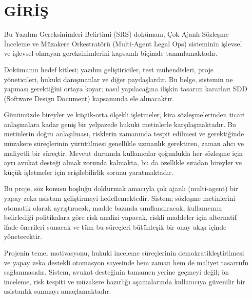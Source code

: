 \documentclass[12pt, a4paper]{article}
\begin{document}
\newpage
\tableofcontents
\newpage

\section{GİRİŞ}

Bu Yazılım Gereksinimleri Belirtimi (SRS) dokümanı, Çok Ajanlı Sözleşme İnceleme ve Müzakere Orkestratörü (Multi-Agent Legal Ops) sisteminin işlevsel ve işlevsel olmayan gereksinimlerini kapsamlı biçimde tanımlamaktadır.

Dokümanın hedef kitlesi; yazılım geliştiriciler, test mühendisleri, proje yöneticileri, hukuki danışmanlar ve diğer paydaşlardır. Bu belge, sistemin ne yapması gerektiğini ortaya koyar; nasıl yapılacağına ilişkin tasarım kararları SDD (Software Design Document) kapsamında ele alınacaktır.

Günümüzde bireyler ve küçük-orta ölçekli işletmeler, kira sözleşmelerinden ticari anlaşmalara kadar geniş bir yelpazede hukuki metinlerle karşılaşmaktadır. Bu metinlerin doğru anlaşılması, risklerin zamanında tespit edilmesi ve gerektiğinde müzakere süreçlerinin yürütülmesi genellikle uzmanlık gerektiren, zaman alıcı ve maliyetli bir süreçtir. Mevcut durumda kullanıcılar çoğunlukla her sözleşme için ayrı avukat desteği almak zorunda kalmakta, bu da özellikle sıradan bireyler ve küçük işletmeler için erişilebilirlik sorunu yaratmaktadır.

Bu proje, söz konusu boşluğu doldurmak amacıyla çok ajanlı (multi-agent) bir yapay zeka asistanı geliştirmeyi hedeflemektedir. Sistem; sözleşme metinlerini otomatik olarak ayrıştıracak, madde bazında sınıflandıracak, kullanıcının belirlediği politikalara göre risk analizi yapacak, riskli maddeler için alternatif ifade önerileri sunacak ve tüm bu süreçleri bütünleşik bir onay akışı içinde yönetecektir.

Projenin temel motivasyonu, hukuki inceleme süreçlerinin demokratikleştirilmesi ve yapay zeka destekli otomasyon sayesinde hem zaman hem de maliyet tasarrufu sağlanmasıdır. Sistem, avukat desteğinin tamamen yerine geçmeyi değil; ön inceleme, risk tespiti ve müzakere hazırlığı aşamalarında kullanıcıya güvenilir bir asistanlık sunmayı amaçlamaktadır.
\end{document}
